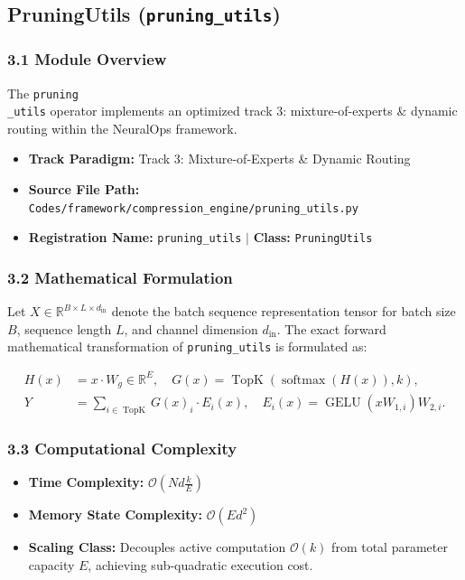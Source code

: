 \subsection{PruningUtils (\texttt{pruning\_utils})}
\label{sec:app_module_pruning_utils}

\subsubsection*{3.1 Module Overview}
The \texttt{pruning\\_utils} operator implements an optimized track 3: mixture-of-experts \& dynamic routing within the NeuralOps framework.
\begin{itemize}
    \item \textbf{Track Paradigm:} Track 3: Mixture-of-Experts & Dynamic Routing
    \item \textbf{Source File Path:} \texttt{Codes/framework/compression\_engine/pruning\_utils.py}
    \item \textbf{Registration Name:} \texttt{pruning\_utils} $\mid$ \textbf{Class:} \texttt{PruningUtils}
\end{itemize}

\subsubsection*{3.2 Mathematical Formulation}
Let $X \in \mathbb{R}^{B \times L \times d_{\text{in}}}$ denote the batch sequence representation tensor for batch size $B$, sequence length $L$, and channel dimension $d_{\text{in}}$. The exact forward mathematical transformation of \texttt{pruning\_utils} is formulated as:

\begin{align}
H(x) &= x \cdot W_g \in \mathbb{R}^{E}, \quad G(x) = \operatorname{TopK}\left(\operatorname{softmax}(H(x)), k\right), \\
Y &= \sum_{i \in \operatorname{TopK}} G(x)_i \cdot E_i(x), \quad E_i(x) = \operatorname{GELU}(x W_{1, i}) W_{2, i}.
\end{align}


\subsubsection*{3.3 Computational Complexity}
\begin{itemize}
    \item \textbf{Time Complexity:} $\mathcal{O}(N d \frac{k}{E})$
    \item \textbf{Memory State Complexity:} $\mathcal{O}(E d^2)$
    \item \textbf{Scaling Class:} Decouples active computation $\mathcal{O}(k)$ from total parameter capacity $E$, achieving sub-quadratic execution cost.
\end{itemize}

